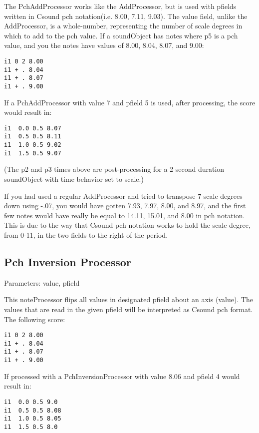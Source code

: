 The PchAddProcessor works like the AddProcessor, but is used with
pfields written in Csound pch notation(i.e. 8.00, 7.11, 9.03). The value
field, unlike the AddProcessor, is a whole-number, representing the
number of scale degrees in which to add to the pch value. If a
soundObject has notes where p5 is a pch value, and you the notes have
values of 8.00, 8.04, 8.07, and 9.00:

\begin{verbatim}
i1 0 2 8.00
i1 + . 8.04
i1 + . 8.07
i1 + . 9.00
\end{verbatim}

If a PchAddProcessor with value 7 and pfield 5 is used, after
processing, the score would result in:

\begin{verbatim}
i1  0.0 0.5 8.07
i1  0.5 0.5 8.11
i1  1.0 0.5 9.02
i1  1.5 0.5 9.07
\end{verbatim}

(The p2 and p3 times above are post-processing for a 2 second duration
soundObject with time behavior set to scale.)

If you had used a regular AddProcessor and tried to transpose 7 scale
degrees down using -.07, you would have gotten 7.93, 7.97, 8.00, and
8.97, and the first few notes would have really be equal to 14.11,
15.01, and 8.00 in pch notation. This is due to the way that Csound pch
notation works to hold the scale degree, from 0-11, in the two fields to
the right of the period.


\subsection{Pch Inversion Processor}\label{pchInversionProcessor}

Parameters: value, pfield

This noteProcessor flips all values in designated pfield about an axis
(value). The values that are read in the given pfield will be
interpreted as Csound pch format. The following score:

\begin{verbatim}
i1 0 2 8.00
i1 + . 8.04
i1 + . 8.07
i1 + . 9.00
\end{verbatim}

If processed with a PchInversionProcessor with value 8.06 and pfield 4
would result in:

\begin{verbatim}
i1  0.0 0.5 9.0
i1  0.5 0.5 8.08
i1  1.0 0.5 8.05
i1  1.5 0.5 8.0    
\end{verbatim}

